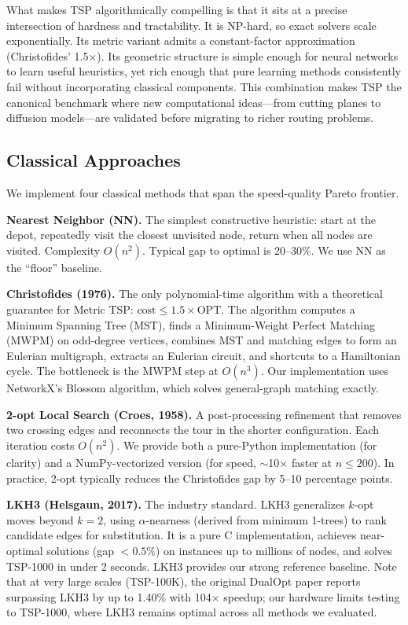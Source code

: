 \documentclass[11pt,a4paper]{article}
\begin{document}
What makes TSP algorithmically compelling is that it sits at a precise intersection of hardness and tractability. It is NP-hard, so exact solvers scale exponentially. Its metric variant admits a constant-factor approximation (Christofides' 1.5$\times$). Its geometric structure is simple enough for neural networks to learn useful heuristics, yet rich enough that pure learning methods consistently fail without incorporating classical components. This combination makes TSP the canonical benchmark where new computational ideas---from cutting planes to diffusion models---are validated before migrating to richer routing problems.

\subsection{Classical Approaches}

We implement four classical methods that span the speed-quality Pareto frontier.

\textbf{Nearest Neighbor (NN).} The simplest constructive heuristic: start at the depot, repeatedly visit the closest unvisited node, return when all nodes are visited. Complexity $O(n^2)$. Typical gap to optimal is 20--30\%. We use NN as the ``floor'' baseline.

\textbf{Christofides (1976).} The only polynomial-time algorithm with a theoretical guarantee for Metric TSP: $\text{cost} \leq 1.5 \times \text{OPT}$. The algorithm computes a Minimum Spanning Tree (MST), finds a Minimum-Weight Perfect Matching (MWPM) on odd-degree vertices, combines MST and matching edges to form an Eulerian multigraph, extracts an Eulerian circuit, and shortcuts to a Hamiltonian cycle. The bottleneck is the MWPM step at $O(n^3)$. Our implementation uses NetworkX's Blossom algorithm, which solves general-graph matching exactly.

\textbf{2-opt Local Search (Croes, 1958).} A post-processing refinement that removes two crossing edges and reconnects the tour in the shorter configuration. Each iteration costs $O(n^2)$. We provide both a pure-Python implementation (for clarity) and a NumPy-vectorized version (for speed, $\sim$10$\times$ faster at $n \leq 200$). In practice, 2-opt typically reduces the Christofides gap by 5--10 percentage points.

\textbf{LKH3 (Helsgaun, 2017).} The industry standard. LKH3 generalizes $k$-opt moves beyond $k=2$, using $\alpha$-nearness (derived from minimum 1-trees) to rank candidate edges for substitution. It is a pure C implementation, achieves near-optimal solutions (gap $<0.5\%$) on instances up to millions of nodes, and solves TSP-1000 in under 2 seconds. LKH3 provides our strong reference baseline. Note that at very large scales (TSP-100K), the original DualOpt paper reports surpassing LKH3 by up to 1.40\% with 104$\times$ speedup; our hardware limits testing to TSP-1000, where LKH3 remains optimal across all methods we evaluated.
\end{document}
